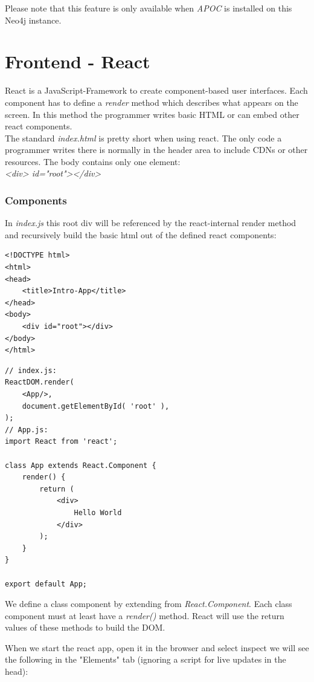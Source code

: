 Please note that this feature is only available when \emph{APOC} is installed on this Neo4j instance.

\section{Frontend - React}
React is a JavaScript-Framework to create component-based user interfaces. Each component has to define a \emph{render} method which describes what appears on the screen. In this method the programmer writes basic HTML or can embed other react components. \\
The standard \emph{index.html} is pretty short when using react. The only code a programmer writes there is normally in the header area to include CDNs or other resources. The body contains only one element: \\
\emph{<div> id="root"></div>} 

\subsubsection{Components}
In \emph{index.js} this root div will be referenced by the react-internal render method and recursively build the basic html out of the defined react components:
\lstset{language=HTML}
\begin{lstlisting}[caption={index.html for Hello World},label={ex250}]
<!DOCTYPE html>
<html>
<head>
	<title>Intro-App</title>
</head>
<body>
	<div id="root"></div>
</body>
</html>
\end{lstlisting}

\lstset{language=JavaScript}
\begin{lstlisting}[caption={Hello World in React},label={ex251}]
// index.js:
ReactDOM.render(
	<App/>,
	document.getElementById( 'root' ),
);
// App.js:
import React from 'react';

class App extends React.Component {
	render() {
		return (
			<div>
				Hello World
			</div>
		);
	}
}

export default App;
\end{lstlisting}

We define a class component by extending from \emph{React.Component}. Each class component must at least have a \emph{render()} method. React will use the return values of these methods to build the DOM.

When we start the react app, open it in the browser and select inspect we will see the following in the "Elements" tab (ignoring a script for live updates in the head):

